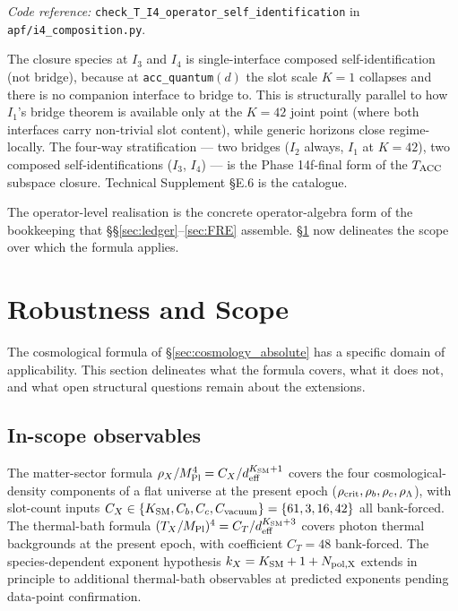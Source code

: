 \documentclass[11pt]{article}
\newcommand{\coderef}[2]{\smallskip\noindent\textit{Code reference:} \texttt{#1} in \texttt{#2}.}
\newcommand{\Mpl}{M_{\rm Pl}}
\begin{document}
\coderef{check\_T\_I4\_operator\_self\_identification}{apf/i4\_composition.py}

\smallskip

\noindent The closure species at $I_3$ and $I_4$ is single-interface composed self-identification (not bridge), because at \texttt{acc\_quantum}$(d)$ the slot scale $K = 1$ collapses and there is no companion interface to bridge to.  This is structurally parallel to how $I_1$'s bridge theorem is available only at the $K = 42$ joint point (where both interfaces carry non-trivial slot content), while generic horizons close regime-locally.  The four-way stratification --- two bridges ($I_2$ always, $I_1$ at $K=42$), two composed self-identifications ($I_3$, $I_4$) --- is the Phase 14f-final form of the $T_{\rm ACC}$ subspace closure.  Technical Supplement \S E.6 is the catalogue.

\smallskip

The operator-level realisation is the concrete operator-algebra form of the bookkeeping that \S\S\ref{sec:ledger}--\ref{sec:FRE} assemble.  \S\ref{sec:robustness} now delineates the scope over which the formula applies.

\section{Robustness and Scope}\label{sec:robustness}

The cosmological formula of \S\ref{sec:cosmology_absolute} has a specific domain of applicability. This section delineates what the formula covers, what it does not, and what open structural questions remain about the extensions.

\subsection{In-scope observables}\label{sec:robustness_in_scope}

The matter-sector formula $\rho_X/\Mpl^4 = C_X/d_{\rm eff}^{K_{\rm SM}+1}$ covers the four cosmological-density components of a flat universe at the present epoch ($\rho_{\rm crit}, \rho_b, \rho_c, \rho_\Lambda$), with slot-count inputs $C_X \in \{K_{\rm SM}, C_b, C_c, C_{\rm vacuum}\} = \{61, 3, 16, 42\}$ all bank-forced. The thermal-bath formula $(T_X/\Mpl)^4 = C_T / d_{\rm eff}^{K_{\rm SM}+3}$ covers photon thermal backgrounds at the present epoch, with coefficient $C_T = 48$ bank-forced. The species-dependent exponent hypothesis $k_X = K_{\rm SM} + 1 + N_{\rm pol,X}$ extends in principle to additional thermal-bath observables at predicted exponents pending data-point confirmation.
\end{document}
